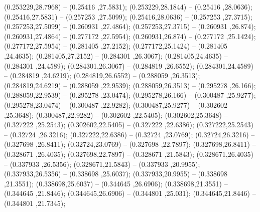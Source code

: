  (0.253229,28.7968) -- (0.25416 ,27.5831);
 (0.253229,28.1844) -- (0.25416 ,28.0636);
 (0.25416,27.5831) -- (0.257253 ,27.5099);
 (0.25416,28.0636) -- (0.257253 ,27.3715);
 (0.257253,27.5099) -- (0.260931 ,27.4864);
 (0.257253,27.3715) -- (0.260931 ,26.874);
 (0.260931,27.4864) -- (0.277172 ,27.5954);
 (0.260931,26.874) -- (0.277172 ,25.1424);
 (0.277172,27.5954) -- (0.281405 ,27.2152);
 (0.277172,25.1424) -- (0.281405 ,24.4635);
 (0.281405,27.2152) -- (0.284301 ,26.3067);
 (0.281405,24.4635) -- (0.284301 ,24.4589);
 (0.284301,26.3067) -- (0.284819 ,26.6552);
 (0.284301,24.4589) -- (0.284819 ,24.6219);
 (0.284819,26.6552) -- (0.288059 ,26.3513);
 (0.284819,24.6219) -- (0.288059 ,22.9539);
 (0.288059,26.3513) -- (0.295278 ,26.166);
 (0.288059,22.9539) -- (0.295278 ,23.0474);
 (0.295278,26.166) -- (0.300487 ,25.9277);
 (0.295278,23.0474) -- (0.300487 ,22.9282);
 (0.300487,25.9277) -- (0.302602 ,25.3648);
 (0.300487,22.9282) -- (0.302602 ,22.5405);
 (0.302602,25.3648) -- (0.327222 ,25.2543);
 (0.302602,22.5405) -- (0.327222 ,22.6386);
 (0.327222,25.2543) -- (0.32724 ,26.3216);
 (0.327222,22.6386) -- (0.32724 ,23.0769);
 (0.32724,26.3216) -- (0.327698 ,26.8411);
 (0.32724,23.0769) -- (0.327698 ,22.7897);
 (0.327698,26.8411) -- (0.328671 ,26.4035);
 (0.327698,22.7897) -- (0.328671 ,21.5843);
 (0.328671,26.4035) -- (0.337933 ,26.5356);
 (0.328671,21.5843) -- (0.337933 ,20.9955);
 (0.337933,26.5356) -- (0.338698 ,25.6037);
 (0.337933,20.9955) -- (0.338698 ,21.3551);
 (0.338698,25.6037) -- (0.344645 ,26.6906);
 (0.338698,21.3551) -- (0.344645 ,21.8446);
 (0.344645,26.6906) -- (0.344801 ,25.031);
 (0.344645,21.8446) -- (0.344801 ,21.7345);
